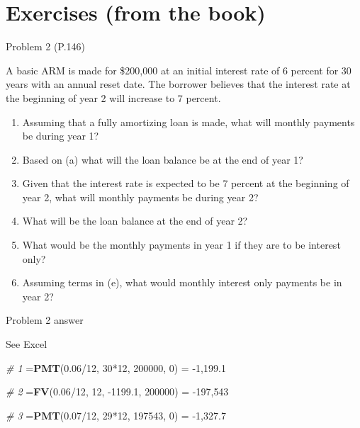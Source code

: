 \documentclass[ignorenonframetext,]{beamer}
\newenvironment{Shaded}{\begin{snugshade}}{\end{snugshade}}
\newcommand{\KeywordTok}[1]{\textcolor[rgb]{0.13,0.29,0.53}{\textbf{{#1}}}}
\newcommand{\DecValTok}[1]{\textcolor[rgb]{0.00,0.00,0.81}{{#1}}}
\newcommand{\FloatTok}[1]{\textcolor[rgb]{0.00,0.00,0.81}{{#1}}}
\newcommand{\StringTok}[1]{\textcolor[rgb]{0.31,0.60,0.02}{{#1}}}
\newcommand{\CommentTok}[1]{\textcolor[rgb]{0.56,0.35,0.01}{\textit{{#1}}}}
\newcommand{\NormalTok}[1]{{#1}}
\providecommand{\tightlist}{%
\setlength{\itemsep}{0pt}\setlength{\parskip}{0pt}}
\begin{document}
\section{Exercises (from the book)}\label{exercises-from-the-book}

\begin{frame}{Problem 2 (P.146)}

\small

A basic ARM is made for \$200,000 at an initial interest rate of 6
percent for 30 years with an annual reset date. The borrower believes
that the interest rate at the beginning of year 2 will increase to 7
percent.

\begin{enumerate}
\def\labelenumi{\alph{enumi}.}
\tightlist
\item
  Assuming that a fully amortizing loan is made, what will monthly
  payments be during year 1?
\item
  Based on (a) what will the loan balance be at the end of year 1?
\item
  Given that the interest rate is expected to be 7 percent at the
  beginning of year 2, what will monthly payments be during year 2?
\item
  What will be the loan balance at the end of year 2?
\item
  What would be the monthly payments in year 1 if they are to be
  interest only?
\item
  Assuming terms in (e), what would monthly interest only payments be in
  year 2?
\end{enumerate}

\end{frame}

\begin{frame}[fragile]{Problem 2 answer}

\begin{Shaded}
\begin{Highlighting}[]
\NormalTok{See Excel}

\CommentTok{# 1}
\NormalTok{=}\KeywordTok{PMT}\NormalTok{(}\FloatTok{0.06}\NormalTok{/}\DecValTok{12}\NormalTok{, }\DecValTok{30}\NormalTok{*}\DecValTok{12}\NormalTok{, }\DecValTok{200000}\NormalTok{, }\DecValTok{0}\NormalTok{) =}\StringTok{ }\NormalTok{-}\DecValTok{1}\NormalTok{,}\FloatTok{199.1}

\CommentTok{# 2}
\NormalTok{=}\KeywordTok{FV}\NormalTok{(}\FloatTok{0.06}\NormalTok{/}\DecValTok{12}\NormalTok{, }\DecValTok{12}\NormalTok{, -}\FloatTok{1199.1}\NormalTok{, }\DecValTok{200000}\NormalTok{) =}\StringTok{ }\NormalTok{-}\DecValTok{197}\NormalTok{,}\DecValTok{543}

\CommentTok{# 3}
\NormalTok{=}\KeywordTok{PMT}\NormalTok{(}\FloatTok{0.07}\NormalTok{/}\DecValTok{12}\NormalTok{, }\DecValTok{29}\NormalTok{*}\DecValTok{12}\NormalTok{, }\DecValTok{197543}\NormalTok{, }\DecValTok{0}\NormalTok{) =}\StringTok{ }\NormalTok{-}\DecValTok{1}\NormalTok{,}\FloatTok{327.7}
\end{Highlighting}
\end{Shaded}

\end{frame}
\end{document}
